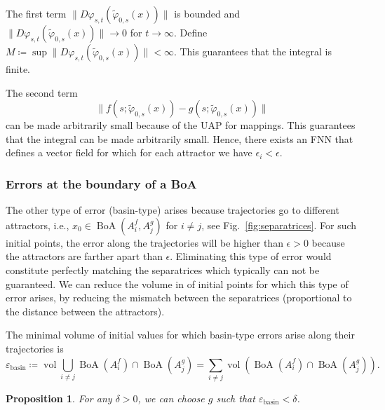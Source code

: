 \documentclass{article}
\newtheorem{proposition}{Proposition}
\theoremstyle{definition}
\theoremstyle{remark}
\newcommand{\vol}{\operatorname{vol}}
\newcommand{\boa}{\operatorname{BoA}}
\newcounter{ct}
\begin{document}
The first term \(\|D\varphi_{s,t}(\tilde{\varphi}_{0,s}(x))\|\) is bounded %
and \(\|D\varphi_{s,t}(\tilde{\varphi}_{0,s}(x))\|\rightarrow 0\) for \(t\rightarrow\infty\).
Define $M\coloneqq \sup \|D\varphi_{s,t}(\tilde{\varphi}_{0,s}(x))\|<\infty$. 
%
This guarantees that the integral is finite.

The second term
\[\|f(s; \tilde{\varphi}_{0,s}(x)) - g(s; \tilde{\varphi}_{0,s}(x))\|\]
can be made arbitrarily small because of the UAP for mappings.
%
This guarantees that the integral can be made arbitrarily small.	
Hence, there exists an FNN that defines a vector field for which for each attractor we have $\epsilon_i<\epsilon$. 






\subsubsection{Errors at the boundary of a BoA}%
\label{sec:separatrix_approx}
The other type of error (basin-type) arises because trajectories go to different attractors, i.e., $x_0\in \boa(A_i^f,A_j^g)$ for $i\neq j$, see Fig.~\ref{fig:separatrices}.
For such initial points, the error along the trajectories will be higher than $\epsilon>0$ because the attractors are farther apart than $\epsilon$.
Eliminating this type of error would constitute perfectly matching the separatrices which typically can not be guaranteed.
We can reduce the volume in of initial points for which this type of error arises, by reducing the mismatch between the separatrices (proportional to the distance between the attractors).

The minimal volume of initial values for which basin-type errors arise along their trajectories is 
\[\varepsilon_{\operatorname{basin}} \coloneqq \vol \bigcup_{i \neq j}\boa(A_i^f)\cap\boa(A_j^g) = \sum_{i \neq j} \vol\left(\boa(A_i^f)\cap\boa(A_j^g)\right).\] %

\begin{proposition}\label{prop:min_sep_bound}
For any $\delta>0$, we can choose $g$ such that $\varepsilon_{\operatorname{basin}}<\delta$.
\end{proposition}
\end{document}
